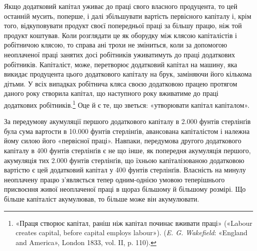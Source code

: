 Якщо додатковий капітал уживає до праці свого власного
продуцента, то цей останній мусить, поперше, і далі збільшувати
вартість первісного капіталу і, крім того, відкуповувати продукт
своєї попередньої праці за більшу працю, ніж той продукт коштував.
Коли розглядати це як оборудку між клясою капіталістів
і робітничою клясою, то справа ані трохи не зміниться,
коли за допомогою неоплаченої праці занятих досі робітників
уживатимуть до праці додаткових робітників. Капіталіст, може,
перетворює додатковий капітал на машину, яка викидає продуцента
цього додаткового капіталу на брук, заміняючи його
кількома дітьми. У всіх випадках робітнича кляса своєю додатковою
працею протягом даного року створила капітал, що наступного
року вживатиме до праці додаткових робітників.\footnote{
«Праця створює капітал, раніш ніж капітал починає вживати
праці» («Labour creates capital, before capital employs labour»). (\emph{E. G.
Wakefield}: «England and America», London 1833, vol. II, p. 110).
} Оце й є те, що зветься: «утворювати капітал капіталом».

За передумову акумуляції першого додаткового капіталу в
2.000 фунтів стерлінґів була сума вартости в 10.000 фунтів стерлінґів,
авансована капіталістом і належна йому силою його
«первісної праці». Навпаки, передумова другого додаткового
капіталу в 400 фунтів стерлінґів є не що інше, як попередня акумуляція
першого, акумуляція тих 2.000 фунтів стерлінґів, що
їхньою капіталізованою додатковою вартістю є цей додатковий
капітал у 400 фунтів стерлінґів. Власність на минулу неоплачену
працю з’являється тепер одним-однією умовою теперішнього
присвоєння живої неоплаченої праці в щораз більшому й
більшому розмірі. Що більше капіталіст акумулював, то більше
може він акумулювати.

